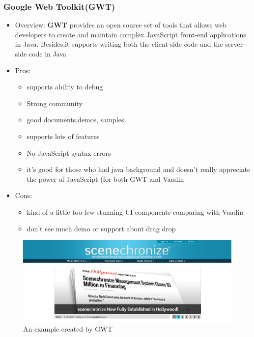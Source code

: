 \documentclass[14pt,a4paper]{extreport}
\begin{document}
		\subsubsection{Google Web Toolkit(GWT)}
			\begin{itemize}
				\item Overview: \textbf{GWT} provides an open source set of tools that allows web developers to create and maintain complex JavaScript front-end applications in Java. Besides,it supports writing both the client-side code and the server-side code in Java
				\item Pros: 
					\begin{itemize}
						\item supports ability to debug
						\item Strong community
						\item good documents,demos, samples
						\item supports lots of features
						\item No JavaScript syntax errors
						\item it's good for those who had java background and doesn't really appreciate the power of JavaScript (for both GWT and Vaadin
					\end{itemize}
				\item Cons:
					\begin{itemize}
						\item kind of a little too few stunning UI components comparing with Vaadin
						\item don't see much demo or support about drag drop
					\end{itemize}
			\end{itemize}
			\begin{figure}
				\begin{center}
					\includegraphics[scale=0.5]{GWT.png}
					\caption{ An example created by GWT}
				\end{center}
 			\end{figure}
			
\end{document}
